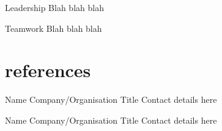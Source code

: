 \documentclass[]{friggeri-cv} %
\begin{document}
\begin{entrylist}




\entry
{}
{Leadership}
{}
{}
{
Blah blah blah
}



\entry
{}
{Teamwork}
{}
{}
{
Blah blah blah
}




\end{entrylist}



\section{references}


\begin{entrylist}


\entry
{}
{Name}
{Company/Organisation}
{Title}
{
Contact details here
}


\entry
{}
{Name}
{Company/Organisation}
{Title}
{
Contact details here
}

\end{entrylist} 

\end{document}
